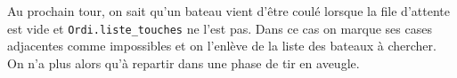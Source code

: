 Au prochain tour, on sait qu'un bateau vient d'être coulé lorsque la file d'attente est vide et \texttt{Ordi.liste\_touches} ne l'est pas. Dans ce cas on marque ses cases adjacentes comme impossibles et on l'enlève de la liste des bateaux à chercher. On n'a plus alors qu'à repartir dans une phase de tir en aveugle.
%
